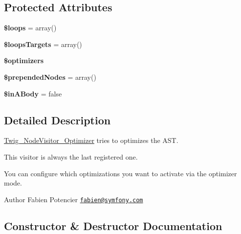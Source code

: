 \subsection*{Protected Attributes}
\begin{DoxyCompactItemize}
\item 
{\bfseries \$loops} = array()\hypertarget{classTwig__NodeVisitor__Optimizer_af6705b385c46421c990eea50ea53622e}{}\label{classTwig__NodeVisitor__Optimizer_af6705b385c46421c990eea50ea53622e}

\item 
{\bfseries \$loops\+Targets} = array()\hypertarget{classTwig__NodeVisitor__Optimizer_a1d341b033bf149ed9a9af2f395cddd8b}{}\label{classTwig__NodeVisitor__Optimizer_a1d341b033bf149ed9a9af2f395cddd8b}

\item 
{\bfseries \$optimizers}\hypertarget{classTwig__NodeVisitor__Optimizer_a0fd10544f1da1979027278698bd4a089}{}\label{classTwig__NodeVisitor__Optimizer_a0fd10544f1da1979027278698bd4a089}

\item 
{\bfseries \$prepended\+Nodes} = array()\hypertarget{classTwig__NodeVisitor__Optimizer_a5678e0a66dea82a059d76a8683f243d3}{}\label{classTwig__NodeVisitor__Optimizer_a5678e0a66dea82a059d76a8683f243d3}

\item 
{\bfseries \$in\+A\+Body} = false\hypertarget{classTwig__NodeVisitor__Optimizer_adcfdd8c8ebb28429979492f7a8af4396}{}\label{classTwig__NodeVisitor__Optimizer_adcfdd8c8ebb28429979492f7a8af4396}

\end{DoxyCompactItemize}


\subsection{Detailed Description}
\hyperlink{classTwig__NodeVisitor__Optimizer}{Twig\+\_\+\+Node\+Visitor\+\_\+\+Optimizer} tries to optimizes the A\+ST.

This visitor is always the last registered one.

You can configure which optimizations you want to activate via the optimizer mode.

\begin{DoxyAuthor}{Author}
Fabien Potencier \href{mailto:fabien@symfony.com}{\tt fabien@symfony.\+com} 
\end{DoxyAuthor}


\subsection{Constructor \& Destructor Documentation}
